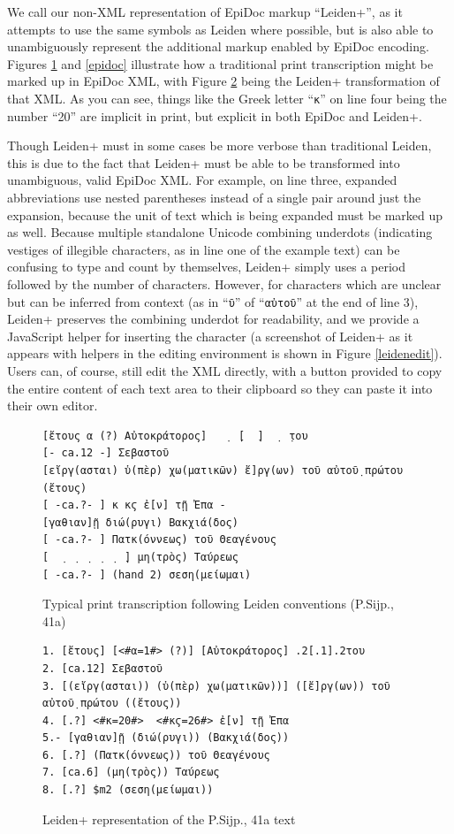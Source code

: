 \documentclass[]{article}
\begin{document}
We call our non-XML representation of EpiDoc markup “Leiden+”, as it attempts to use the same symbols as Leiden where possible, but is also able to unambiguously represent the additional markup enabled by EpiDoc encoding. Figures \ref{leiden} and \ref{epidoc} illustrate how a traditional print transcription might be marked up in EpiDoc XML, with Figure \ref{leidenp} being the Leiden+ transformation of that XML. As you can see, things like the Greek letter “\texttt{κ}” on line four being the number “20” are implicit in print, but explicit in both EpiDoc and Leiden+.

Though Leiden+ must in some cases be more verbose than traditional Leiden, this is due to the fact that Leiden+ must be able to be transformed into unambiguous, valid EpiDoc XML. For example, on line three, expanded abbreviations use nested parentheses instead of a single pair around just the expansion, because the unit of text which is being expanded must be marked up as well. Because multiple standalone Unicode combining underdots (indicating vestiges of illegible characters, as in line one of the example text) can be confusing to type and count by themselves, Leiden+ simply uses a period followed by the number of characters. However, for characters which are unclear but can be inferred from context (as in “\texttt{ῦ}” of
“\texttt{αὐτοῦ}”
at the end of line 3), Leiden+ preserves the combining underdot for readability, and we provide a JavaScript helper for inserting the character (a screenshot of Leiden+ as it appears with helpers in the editing environment is shown in Figure \ref{leidenedit}). Users can, of course, still edit the XML directly, with a button provided to copy the entire content of each text area to their clipboard so they can paste it into their own editor.

\begin{figure}[!hbt]
    \begin{verbatim}
[ἔτους α (?) Αὐτοκράτορος]   ̣  ̣[  ̣]  ̣  ̣του 
[- ca.12 -] Σεβαστοῦ 
[εἴργ(ασται) ὑ(πὲρ) χω(ματικῶν) ἔ]ργ(ων) τοῦ αὐτοῦ̣ πρώτου (ἔτους) 
[ -ca.?- ] κ κϛ ἐ[ν] τῇ Ἐπα -
[γαθιαν]ῇ διώ(ρυγι) Βακχιά(δος) 
[ -ca.?- ] Πατκ(όννεως) τοῦ Θεαγένους 
[  ̣  ̣  ̣  ̣  ̣  ̣] μη(τρὸς) Ταύρεως 
[ -ca.?- ] (hand 2) σεση(μείωμαι)
    \end{verbatim}
    \caption{Typical print transcription following Leiden conventions (P.Sijp., 41a)\label{leiden}}
\end{figure}\nocite{psijp}

\begin{figure}[!hbt]
    \begin{verbatim}
1. [ἔτους] [<#α=1#> (?)] [Αὐτοκράτορος] .2[.1].2του
2. [ca.12] Σεβαστοῦ
3. [(εἴργ(ασται)) (ὑ(πὲρ) χω(ματικῶν))] ([ἔ]ργ(ων)) τοῦ αὐτοῦ̣ πρώτου ((ἔτους))
4. [.?] <#κ=20#>  <#κϛ=26#> ἐ[ν] τῇ Ἐπα
5.- [γαθιαν]ῇ (διώ(ρυγι)) (Βακχιά(δος))
6. [.?] (Πατκ(όννεως)) τοῦ Θεαγένους
7. [ca.6] (μη(τρὸς)) Ταύρεως
8. [.?] $m2 (σεση(μείωμαι))
    \end{verbatim}
    \caption{Leiden+ representation of the P.Sijp., 41a text\label{leidenp}}
\end{figure}
\end{document}
